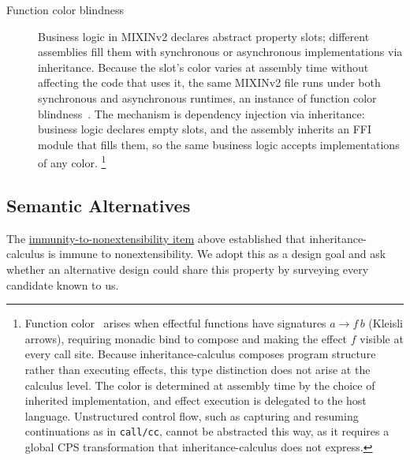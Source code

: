 \begin{description}
  \item[Function color blindness]
    \label{sec:practical-function-color}
    Business logic in MIXINv2 declares abstract property slots;
    different assemblies fill them with synchronous or
    asynchronous implementations via inheritance.
    Because the slot's color varies at assembly time without
    affecting the code that uses it, the same MIXINv2 file runs
    under both synchronous and asynchronous
    runtimes, an instance of function color
    blindness~\cite{nystrom2015-function-color}.
    The mechanism is dependency injection via inheritance:
    business logic declares empty slots, and the assembly
    inherits an FFI module that fills them, so the same
    business logic accepts implementations of any color.%
    \footnote{
      Function color~\cite{nystrom2015-function-color} arises when
      effectful functions have signatures $a \to f\,b$ (Kleisli
      arrows), requiring monadic bind to compose and making the
      effect $f$ visible at every call site.
      Because inheritance-calculus composes program structure
      rather than executing effects, this type distinction does
      not arise at the calculus level.
      The color is determined at assembly time by the choice of
      inherited implementation, and effect execution is delegated
      to the host language.
      Unstructured control flow, such as capturing and resuming
      continuations as in \texttt{call/cc}, cannot be abstracted
      this way, as it requires a global CPS transformation that
      inheritance-calculus does not express.
    }
\end{description}

\subsection{Semantic Alternatives}
\label{sec:semantic-variants}

The \hyperref[item:immunity]{immunity-to-nonextensibility item} above established that inheritance-calculus is immune
to nonextensibility.
We adopt this as a design goal and ask whether an alternative
design could share this property
by surveying every candidate known to us.

